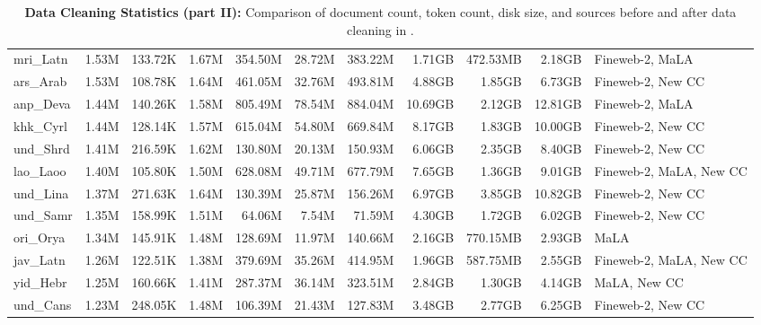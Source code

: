 \begin{table*}[!htp]
{\begin{tabular}{l|rrr|rrr|rrr|l}
mri\_Latn                   & 1.53M      & 133.72K      & 1.67M       & 354.50M      & 28.72M         & 383.22M       & 1.71GB     & 472.53MB     & 2.18GB      & Fineweb-2, MaLA         \\
ars\_Arab                   & 1.53M      & 108.78K      & 1.64M       & 461.05M      & 32.76M         & 493.81M       & 4.88GB     & 1.85GB       & 6.73GB      & Fineweb-2, New CC       \\
anp\_Deva                   & 1.44M      & 140.26K      & 1.58M       & 805.49M      & 78.54M         & 884.04M       & 10.69GB    & 2.12GB       & 12.81GB     & Fineweb-2, MaLA         \\
khk\_Cyrl                   & 1.44M      & 128.14K      & 1.57M       & 615.04M      & 54.80M         & 669.84M       & 8.17GB     & 1.83GB       & 10.00GB     & Fineweb-2, New CC       \\
und\_Shrd                   & 1.41M      & 216.59K      & 1.62M       & 130.80M      & 20.13M         & 150.93M       & 6.06GB     & 2.35GB       & 8.40GB      & Fineweb-2, New CC       \\
lao\_Laoo                   & 1.40M      & 105.80K      & 1.50M       & 628.08M      & 49.71M         & 677.79M       & 7.65GB     & 1.36GB       & 9.01GB      & Fineweb-2, MaLA, New CC \\
und\_Lina                   & 1.37M      & 271.63K      & 1.64M       & 130.39M      & 25.87M         & 156.26M       & 6.97GB     & 3.85GB       & 10.82GB     & Fineweb-2, New CC       \\
und\_Samr                   & 1.35M      & 158.99K      & 1.51M       & 64.06M       & 7.54M          & 71.59M        & 4.30GB     & 1.72GB       & 6.02GB      & Fineweb-2, New CC       \\
ori\_Orya                   & 1.34M      & 145.91K      & 1.48M       & 128.69M      & 11.97M         & 140.66M       & 2.16GB     & 770.15MB     & 2.93GB      & MaLA                    \\
jav\_Latn                   & 1.26M      & 122.51K      & 1.38M       & 379.69M      & 35.26M         & 414.95M       & 1.96GB     & 587.75MB     & 2.55GB      & Fineweb-2, MaLA, New CC \\
yid\_Hebr                   & 1.25M      & 160.66K      & 1.41M       & 287.37M      & 36.14M         & 323.51M       & 2.84GB     & 1.30GB       & 4.14GB      & MaLA, New CC            \\
und\_Cans                   & 1.23M      & 248.05K      & 1.48M       & 106.39M      & 21.43M         & 127.83M       & 3.48GB     & 2.77GB       & 6.25GB      & Fineweb-2, New CC       \\
\bottomrule
\end{tabular}}
\caption{
\label{tab_app:data_clean_2}
\textbf{Data Cleaning Statistics (part II):} Comparison of document count, token count, disk size, and sources before and after data cleaning  in \dcad.
}
\end{table*}

